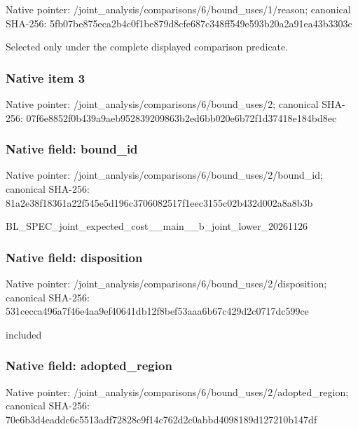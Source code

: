 \documentclass[10pt,a4paper]{article}
\begin{document}
Native pointer: /joint\_analysis/comparis\allowbreak{}ons/6/bound\_uses/1/reaso\allowbreak{}n; canonical SHA-256: 5fb07be875eca2b4c0f1be87\allowbreak{}9d8cfe687c348ff549e593b2\allowbreak{}0a2a91ea43b3303c


Selected only under the complete displayed comparison predicate.


\subsubsection{Native item 3}


Native pointer: /joint\_analysis/comparis\allowbreak{}ons/6/bound\_uses/2; canonical SHA-256: 07f6e8852f0b439a9aeb9528\allowbreak{}39209863b2ed6bb020e6b72f\allowbreak{}1d37418e184bd8ec



\subsubsection{Native field: bound\_id}


Native pointer: /joint\_analysis/comparis\allowbreak{}ons/6/bound\_uses/2/bound\allowbreak{}\_id; canonical SHA-256: 81a2e38f18361a22f545e5d1\allowbreak{}96c3706082517f1eec3155c0\allowbreak{}2b432d002a8a8b3b


BL\_SPEC\_joint\_expected\_c\allowbreak{}ost\_\_main\_\_b\_joint\_lower\allowbreak{}\_20261126


\subsubsection{Native field: disposition}


Native pointer: /joint\_analysis/comparis\allowbreak{}ons/6/bound\_uses/2/dispo\allowbreak{}sition; canonical SHA-256: 531cecca496a7f46e4aa9ef4\allowbreak{}0641db12f8bef53aaa6b67c4\allowbreak{}29d2c0717dc599ce


included


\subsubsection{Native field: adopted\_region}


Native pointer: /joint\_analysis/comparis\allowbreak{}ons/6/bound\_uses/2/adopt\allowbreak{}ed\_region; canonical SHA-256: 70e6b3d4eaddc6c5513adf72\allowbreak{}828c9f14c762d2c0abbd4098\allowbreak{}189d127210b147df
\end{document}
